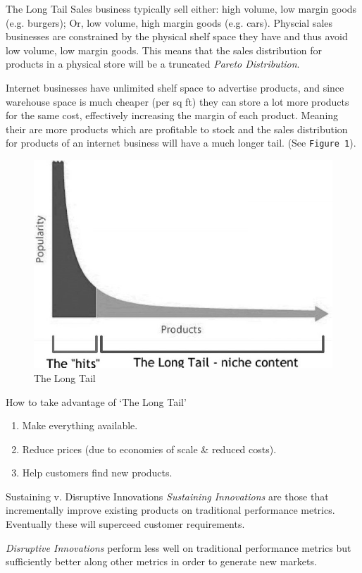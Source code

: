 \documentclass[11pt,a4paper]{article}
\begin{document}
  \begin{proposition}{The Long Tail}
    Sales business typically sell either: high volume, low margin goods (e.g. burgers); Or, low volume, high margin goods (e.g. cars). Physcial sales businesses are constrained by the physical shelf space they have and thus avoid low volume, low margin goods. This means that the sales distribution for products in a physical store will be a truncated \textit{Pareto Distribution}.\\
    \par Internet businesses have unlimited shelf space to advertise products, and since warehouse space is much cheaper (per sq ft) they can store a lot more products for the same cost, effectively increasing the margin of each product. Meaning their are more products which are profitable to stock and the sales distribution for products of an internet business will have a much longer tail. (See \texttt{Figure 1}).
  \end{proposition}

  \begin{figure}[ht!]
    \centering
    \includegraphics[width=.5\textwidth]{LongTail.jpg}
    \caption{The Long Tail}
  \end{figure}

  \begin{remark}{How to take advantage of `The Long Tail'}
    \begin{enumerate}
      \item Make everything available.
      \item Reduce prices (due to economies of scale \& reduced costs).
      \item Help customers find new products.
    \end{enumerate}
  \end{remark}

  \begin{remark}{Sustaining v. Disruptive Innovations}
    \textit{Sustaining Innovations} are those that incrementally improve existing products on traditional performance metrics. Eventually these will superceed customer requirements.
    \par \textit{Disruptive Innovations} perform less well on traditional performance metrics but sufficiently better along other metrics in order to generate new markets.
  \end{remark}
\end{document}

